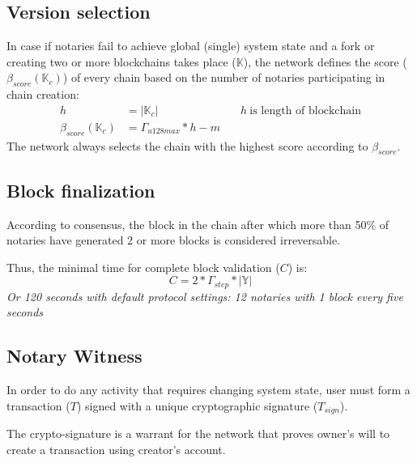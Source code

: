 \documentclass[12pt]{report}
\newcommand{\hlc}[1]{\colorbox{white!25}{#1}}
\begin{document}
\subsection{Version selection}
\label{tech-blockchain-score}
In case if notaries fail to achieve global (single) system state and a fork or creating two or more blockchains takes place ($\mathbb{K}$), the network defines the score ($\beta_{score}(\mathbb{K}_c)$) of every  chain based on the number of notaries participating in \hlc{chain creation}:	
\begin{align}
h &= |\mathbb{K}_c| & \quad h \ \text{is length of blockchain} \\
\beta_{score}(\mathbb{K}_c) &= \Gamma_{u128max} * h - m
\end{align}
The network always selects the chain with the highest score according to $\beta_{score}$.
\subsection{Block finalization}
\label{tech-blockchain-fin}
According to consensus, the block in the chain after which more than 50\% of notaries have generated 2 or more blocks is considered irreversable.

Thus, the minimal time for complete block validation ($C$) is:
\begin{equation}
C = 2 * \Gamma_{step} * |\mathbb{Y}|
\end{equation}
\textit{Or 120 seconds with default protocol settings: 12 notaries with 1 block every five seconds}
\subsection{Notary Witness}
\label{tech-blockchain-confirmation}
In order to do any activity that requires changing system state, user must form a transaction ($T$) signed with a unique cryptographic signature ($T_{sign}$). 

The crypto-signature is a warrant for the network that proves owner's will to create a transaction using creator's account. 
\end{document}
